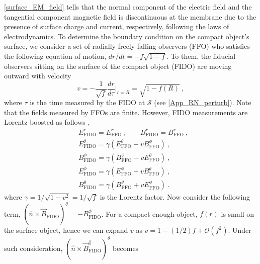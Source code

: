\documentclass[aps,prd,twocolumn,floatfix,noshowpacs,tightenlines,noshowkeys,superscriptaddress,amsmath,amssymb,
nofootinbib]{revtex4-1}
\renewcommand\[{\begin{equation}}
\renewcommand\]{\end{equation}}
\begin{document}
\autoref{surface_EM_field} tells that the normal component of the electric field and the tangential component magnetic field is discontinuous at the membrane due to the presence of surface charge and current, respectively, following the laws of electrodynamics.
To determine the boundary condition on the compact object's surface, we consider a set of radially freely falling observers (FFO) who satisfies the following equation of motion, $dr/dt=-f\sqrt{1-f}$. To them, the fiducial observers sitting on the surface of the compact object (FIDO) are moving outward with velocity \cite{Thorne} 
\begin{equation}\label{FIDO}
v=-\dfrac{1}{\sqrt{f}}\dfrac{dr}{d\tau}\bigg|_{r=R}=\sqrt{1-f(R)}~,
\end{equation}
where $\tau$ is the time measured by the FIDO at $\mathcal{S}$ (see \autoref{App_RN_perturb}). Note that the fields measured by FFOs are finite. However, FIDO measurements are Lorentz boosted as follows \cite{Thorne},
\begin{eqnarray}\label{lorentz_boost}
	&{E}^r_{\textrm{FIDO}}=E^r_\textrm{FFO} \,,\qquad{B}^r_{\textrm{FIDO}}=B^r_{\textrm{FFO}}\nonumber~,\\
	&{E}^\theta_{\textrm{FIDO}}=\gamma\left(E^\theta_{\textrm{FFO}}-v B^\phi_{\textrm{FFO}}\right) \nonumber~,\\&{B}^\phi_{\textrm{FIDO}}=\gamma\left(B^\phi_{\textrm{FFO}}-v {E}^\theta_{\textrm{FFO}}\right)~,\\
	&{E}^\phi_{\textrm{FIDO}}=\gamma\left(E^\phi_{\textrm{FFO}}+v B^\theta_{\textrm{FFO}}\right)\nonumber~, \\&{B}^\theta_{\textrm{FIDO}}=\gamma\left(B^\theta_{\textrm{FFO}}+v {E}^\phi_{\textrm{FFO}}\right)\nonumber~.
\end{eqnarray}
where $\gamma=1/\sqrt{1-v^2}=1/\sqrt{f}$ is the Lorentz factor. Now consider the following term, $(\hat{n}\times \vec{B}^\parallel_{\textrm{FIDO}})^{\theta}=-B^{\phi}_{\textrm{FIDO}}$. For a compact enough object, $f(r)$ is small on the surface object, hence we can expand $v$ as $v=1-(1/2)f+\mathcal{O}(f^2)$. Under such consideration, $(\hat{n}\times \vec{B}^\parallel_{\textrm{FIDO}})^{\theta}$ becomes
\end{document}
